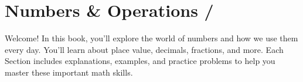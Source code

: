 \cleardoublepage
\chapter{Numbers \& Operations / }
Welcome! In this book, you'll explore the world of numbers and how we use them 
every day. You'll learn about place value, decimals, 
fractions, and more. 
Each Section includes explanations, examples, and practice problems to help 
you master these important math skills.






% 
% 
% 
% 
% 
% 
% 
